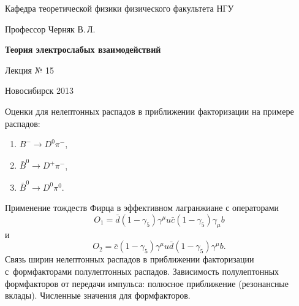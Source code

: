 \documentclass[12pt,pagesize,paper=192mm:108mm]{scrbook}
\begin{document}
\begin{titlepage}
\begin{center}
    Кафедра теоретической физики физического факультета НГУ
    \medskip

    \Large
    Профессор Черняк В.\,Л.
    \bigskip

    \huge
    \textbf{Теория электрослабых взаимодействий}
    \bigskip

    \Large
    Лекция № 15
    \vfill

    \vfill

\normalsize    Новосибирск 2013
  \smallskip

  \ccbysa
  \end{center}
\end{titlepage}
\newpage

\vspace*{-1em}
\begin{center}
 \vfill
  \begin{minipage}{0.66\linewidth}
    Оценки для нелептонных распадов в приближении факторизации на
    примере распадов:
    \begin{enumerate}
    \item $B^-\to D^0\pi^-$,
    \item $\bar{B}^0\to D^+\pi^-$,
    \item $\bar{B}^0\to D^0\pi^0$.
    \end{enumerate}

    Применение тождеств Фирца в эффективном лагранжиане с операторами
    \[O_1=\bar{d}\left(1-\gamma_5\right)\gamma^{\mu}u\bar{c}\left(1-\gamma_5\right)\gamma_{\mu}b\]
    и
    \[O_2=\bar{c}\left(1-\gamma_5\right)\gamma^{\mu}u\bar{d}\left(1-\gamma_5\right)\gamma^{\mu}b.\]
    Связь ширин нелептонных распадов в приближении факторизации
    с~формфакторами полулептонных распадов.  Зависимость полулептонных
    формфакторов от передачи импульса: полюсное приближение
    (резонансные вклады). Численные значения для формфакторов.
  \end{minipage}
  \vfill

\end{center}
\end{document}
